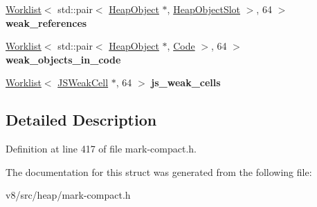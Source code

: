 \begin{DoxyCompactItemize}
\mbox{\hyperlink{classv8_1_1internal_1_1Worklist}{Worklist}}$<$ std\+::pair$<$ \mbox{\hyperlink{classv8_1_1internal_1_1HeapObject}{Heap\+Object}} $\ast$, \mbox{\hyperlink{classv8_1_1internal_1_1HeapObjectSlot}{Heap\+Object\+Slot}} $>$, 64 $>$ {\bfseries weak\+\_\+references}
\item 
\mbox{\label{structv8_1_1internal_1_1WeakObjects_a370b62855aa18b014d7eab29ab030885}} 
\mbox{\hyperlink{classv8_1_1internal_1_1Worklist}{Worklist}}$<$ std\+::pair$<$ \mbox{\hyperlink{classv8_1_1internal_1_1HeapObject}{Heap\+Object}} $\ast$, \mbox{\hyperlink{classv8_1_1internal_1_1Code}{Code}} $>$, 64 $>$ {\bfseries weak\+\_\+objects\+\_\+in\+\_\+code}
\item 
\mbox{\label{structv8_1_1internal_1_1WeakObjects_a9c2c60d220b19a21dfc492a09a45b875}} 
\mbox{\hyperlink{classv8_1_1internal_1_1Worklist}{Worklist}}$<$ \mbox{\hyperlink{classv8_1_1internal_1_1JSWeakCell}{J\+S\+Weak\+Cell}} $\ast$, 64 $>$ {\bfseries js\+\_\+weak\+\_\+cells}
\end{DoxyCompactItemize}


\subsection{Detailed Description}


Definition at line 417 of file mark-\/compact.\+h.



The documentation for this struct was generated from the following file\+:\begin{DoxyCompactItemize}
\item 
v8/src/heap/mark-\/compact.\+h\end{DoxyCompactItemize}
